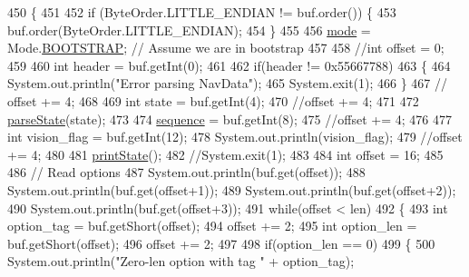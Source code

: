 \begin{DoxyCode}
450     \{
451         
452         \textcolor{keywordflow}{if} (ByteOrder.LITTLE\_ENDIAN != buf.order()) \{
453             buf.order(ByteOrder.LITTLE\_ENDIAN);
454         \}
455         
456         \hyperlink{classworkspace_1_1_a_r_drone_nav_data_1_1src_1_1controller_1_1_drone_test_a2a8ad2faa7de6fe34059387c6203324b}{mode} = Mode.\hyperlink{enumworkspace_1_1_a_r_drone_nav_data_1_1src_1_1controller_1_1_mode_a2120c5fbe7850731f0921fa1523a0f67}{BOOTSTRAP}; \textcolor{comment}{// Assume we are in bootstrap}
457 
458         \textcolor{comment}{//int offset = 0;}
459 
460         \textcolor{keywordtype}{int} header = buf.getInt(0);
461         
462         \textcolor{keywordflow}{if}(header != 0x55667788)
463         \{
464             System.out.println(\textcolor{stringliteral}{"Error parsing NavData"});
465             System.exit(1);
466         \}
467        \textcolor{comment}{// offset += 4;}
468 
469         \textcolor{keywordtype}{int} state = buf.getInt(4);
470         \textcolor{comment}{//offset += 4;}
471 
472         \hyperlink{classworkspace_1_1_a_r_drone_nav_data_1_1src_1_1controller_1_1_drone_test_af3e38b1e3c17291303f1363d8ebb3cff}{parseState}(state);
473 
474         \hyperlink{classworkspace_1_1_a_r_drone_nav_data_1_1src_1_1controller_1_1_drone_test_af2d00cb6ad7c1629ef89c5c9847a1c99}{sequence} = buf.getInt(8);
475         \textcolor{comment}{//offset += 4;}
476 
477         \textcolor{keywordtype}{int} vision\_flag = buf.getInt(12);
478         System.out.println(vision\_flag);
479         \textcolor{comment}{//offset += 4;}
480         
481         \hyperlink{classworkspace_1_1_a_r_drone_nav_data_1_1src_1_1controller_1_1_drone_test_a05fb24f0297add05fe4e8aae1c4a5c77}{printState}();
482         \textcolor{comment}{//System.exit(1);}
483         
484         \textcolor{keywordtype}{int} offset = 16;
485 
486         \textcolor{comment}{// Read options}
487         System.out.println(buf.get(offset));
488         System.out.println(buf.get(offset+1));
489         System.out.println(buf.get(offset+2));
490         System.out.println(buf.get(offset+3));
491         \textcolor{keywordflow}{while}(offset < len)
492         \{
493             \textcolor{keywordtype}{int} option\_tag = buf.getShort(offset);
494             offset += 2;
495             \textcolor{keywordtype}{int} option\_len = buf.getShort(offset);
496             offset += 2;
497 
498             \textcolor{keywordflow}{if}(option\_len == 0)
499             \{
500                 System.out.println(\textcolor{stringliteral}{"Zero-len option with tag "} + option\_tag);

\end{DoxyCode}
